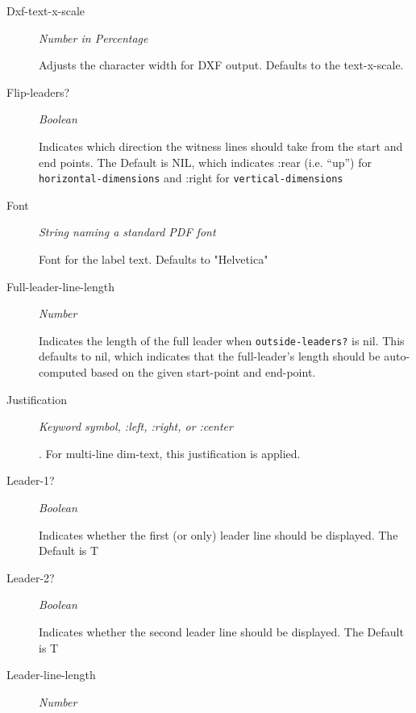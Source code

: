 \documentclass [11pt]{book}
\begin{document}
\begin{itemize}
\begin{description}
\item [Dxf-text-x-scale]
\emph{Number in Percentage}

 Adjusts the character width for DXF output. Defaults to the text-x-scale.




\item [Flip-leaders?]
\emph{Boolean}

 Indicates which direction the witness lines should take from the start and end points. The Default is NIL,
which indicates :rear (i.e. ``up'') for \texttt{horizontal-dimensions} and :right for \texttt{vertical-dimensions}




\item [Font]
\emph{String naming a standard PDF font}

 Font for the label text. Defaults to "Helvetica"




\item [Full-leader-line-length]
\emph{Number}

 Indicates the length of the full leader when \texttt{outside-leaders?} is nil. This defaults to nil,
which indicates that the full-leader's length should be auto-computed based on the given start-point and end-point.




\item [Justification]
\emph{Keyword symbol, :left, :right, or :center}

.
For multi-line dim-text, this justification is applied.




\item [Leader-1?]
\emph{Boolean}

 Indicates whether the first (or only) leader line should be displayed. The Default is T




\item [Leader-2?]
\emph{Boolean}

 Indicates whether the second leader line should be displayed. The Default is T




\item [Leader-line-length]
\emph{Number}


\end{description}
\end{itemize}
\end{document}
